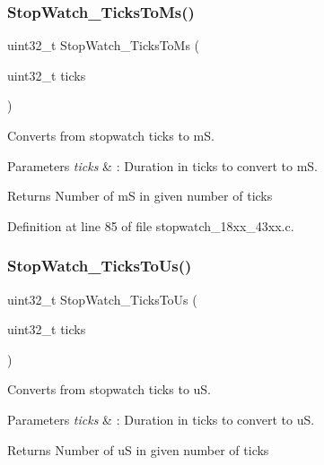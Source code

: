 \subsubsection{\texorpdfstring{Stop\+Watch\+\_\+\+Ticks\+To\+Ms()}{StopWatch\_TicksToMs()}}
{\footnotesize\ttfamily uint32\+\_\+t Stop\+Watch\+\_\+\+Ticks\+To\+Ms (\begin{DoxyParamCaption}\item[{uint32\+\_\+t}]{ticks }\end{DoxyParamCaption})}



Converts from stopwatch ticks to mS. 


\begin{DoxyParams}{Parameters}
{\em ticks} & \+: Duration in ticks to convert to mS. \\
\hline
\end{DoxyParams}
\begin{DoxyReturn}{Returns}
Number of mS in given number of ticks 
\end{DoxyReturn}


Definition at line 85 of file stopwatch\+\_\+18xx\+\_\+43xx.\+c.

\mbox{\label{group___stop___watch_ga76fc3c7b473615677932efe3e5d0e142}} 
\subsubsection{\texorpdfstring{Stop\+Watch\+\_\+\+Ticks\+To\+Us()}{StopWatch\_TicksToUs()}}
{\footnotesize\ttfamily uint32\+\_\+t Stop\+Watch\+\_\+\+Ticks\+To\+Us (\begin{DoxyParamCaption}\item[{uint32\+\_\+t}]{ticks }\end{DoxyParamCaption})}



Converts from stopwatch ticks to uS. 


\begin{DoxyParams}{Parameters}
{\em ticks} & \+: Duration in ticks to convert to uS. \\
\hline
\end{DoxyParams}
\begin{DoxyReturn}{Returns}
Number of uS in given number of ticks 
\end{DoxyReturn}


